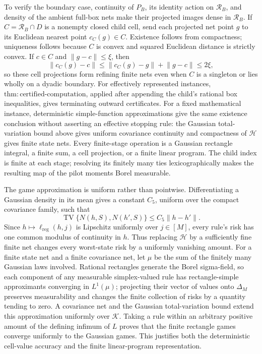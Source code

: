 To verify the boundary case, continuity of \(P_B\), its identity action on \(\mathcal R_B\), and density of the ambient full-box nets make their projected images dense in \(\mathcal R_B\). If \(C=\mathcal R_B\cap D\) is a nonempty closed child cell, send each projected net point \(g\) to its Euclidean nearest point \(c_C(g)\in C\). Existence follows from compactness; uniqueness follows because \(C\) is convex and squared Euclidean distance is strictly convex. If \(c\in C\) and \(\lVert g-c\rVert\le\xi\), then
\[
\lVert c_C(g)-c\rVert
\le\lVert c_C(g)-g\rVert+\lVert g-c\rVert\le2\xi,
\]
so these cell projections form refining finite nets even when \(C\) is a singleton or lies wholly on a dyadic boundary. For effectively represented instances, \(\mathrm{thm:certified\text{-}computation}\), applied after appending the child's rational box inequalities, gives terminating outward certificates. For a fixed mathematical instance, deterministic simple-function approximations give the same existence conclusion without asserting an effective stopping rule: the Gaussian total-variation bound above gives uniform covariance continuity and compactness of \(\mathcal H\) gives finite state nets. Every finite-stage operation is a Gaussian rectangle integral, a finite sum, a cell projection, or a finite linear program. The child index is finite at each stage; resolving its finitely many ties lexicographically makes the resulting map of the pilot moments Borel measurable.

The game approximation is uniform rather than pointwise. Differentiating a Gaussian density in its mean gives a constant \(C_5\), uniform over the compact covariance family, such that
\[
\operatorname{TV}\{N(h,S),N(h',S)\}\le C_5\lVert h-h'\rVert.
\]
Since \(h\mapsto\ell_{\mathrm{reg}}(h,j)\) is Lipschitz uniformly over \(j\in[M]\), every rule's risk has one common modulus of continuity in \(h\). Thus replacing \(\mathcal H\) by a sufficiently fine finite net changes every worst-state risk by a uniformly vanishing amount. For a finite state net and a finite covariance net, let \(\mu\) be the sum of the finitely many Gaussian laws involved. Rational rectangles generate the Borel sigma-field, so each component of any measurable simplex-valued rule has rectangle-simple approximants converging in \(L^1(\mu)\); projecting their vector of values onto \(\Delta_M\) preserves measurability and changes the finite collection of risks by a quantity tending to zero. A covariance net and the Gaussian total-variation bound extend this approximation uniformly over \(\mathcal K\). Taking a rule within an arbitrary positive amount of the defining infimum of \(L\) proves that the finite rectangle games converge uniformly to the Gaussian games. This justifies both the deterministic cell-value accuracy and the finite linear-program representation.

